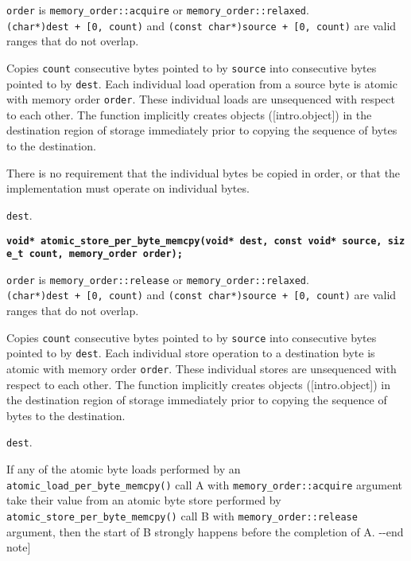 \begin{itemdescr}
\pnum
\expects

\texttt{order} is \texttt{memory\_order::acquire} or
\texttt{memory\_order::relaxed}. \texttt{(char*)dest\ +\ {[}0,\ count)}
and \texttt{(const\ char*)source\ +\ {[}0,\ count)} are valid ranges
that do not overlap.

\pnum
\effects
Copies \texttt{count} consecutive bytes pointed to by
\texttt{source} into consecutive bytes pointed to by \texttt{dest}. Each
individual load operation from a source byte is atomic with memory order
\texttt{order}. These individual loads are unsequenced with respect to
each other. The function implicitly creates objects ({[}intro.object{]})
in the destination region of storage immediately prior to copying the
sequence of bytes to the destination. 
\begin{note} There is no requirement
that the individual bytes be copied in order, or that the implementation
must operate on individual bytes. \end{note}

\pnum
\returns
\texttt{dest}.
\end{itemdescr}

\textbf{\texttt{void*\ atomic\_store\_per\_byte\_memcpy(void*\ dest,\ const\ void*\ source,\ size\_t\ count,\ memory\_order\ order);}}

\begin{itemdescr}
\pnum
\expects
\texttt{order} is \texttt{memory\_order::release} or
\texttt{memory\_order::relaxed}. \texttt{(char*)dest\ +\ {[}0,\ count)}
and \texttt{(const\ char*)source\ +\ {[}0,\ count)} are valid ranges
that do not overlap.

\pnum
\effects
Copies \texttt{count} consecutive bytes pointed to by
\texttt{source} into consecutive bytes pointed to by \texttt{dest}. Each
individual store operation to a destination byte is atomic with memory
order \texttt{order}. These individual stores are unsequenced with
respect to each other. The function implicitly creates objects
({[}intro.object{]}) in the destination region of storage immediately
prior to copying the sequence of bytes to the destination.

\pnum
\returns

\texttt{dest}.
\end{itemdescr}

\begin{note} If any of the atomic byte loads performed by an
\texttt{atomic\_load\_per\_byte\_memcpy()} call A with
\texttt{memory\_order::acquire} argument take their value from an atomic
byte store performed by \texttt{atomic\_store\_per\_byte\_memcpy()} call
B with \texttt{memory\_order::release} argument, then the start of B
strongly happens before the completion of A. -\/-end note{]}
\end{note}  
